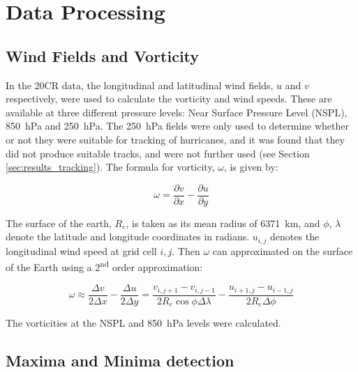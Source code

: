 \documentclass[pdftex,12pt,a4paper]{report}
\newcommand{\ts}{\textsuperscript}
\begin{document}
\section{Data Processing}

\subsection{Wind Fields and Vorticity}
\label{sec:vort}

In the 20CR data, the longitudinal and latitudinal wind fields, $u$ and $v$ respectively, were used
to calculate the vorticity and wind speeds. These are available at three different pressure levels:
Near Surface Pressure Level (NSPL), \SI{850}{hPa} and \SI{250}{hPa}. The \SI{250}{hPa} fields were
only used to determine whether or not they were suitable for tracking of hurricanes, and it was
found that they did not produce suitable tracks, and were not further used (see Section
\ref{sec:results_tracking}). The formula for vorticity, $\omega$, is given by:

\begin{equation}
    \omega = \frac{\partial v}{\partial x} - \frac{\partial u}{\partial y}
    \label{eqn:vorticity}
\end{equation}

The surface of the earth, $R_e$, is taken as its mean radius of \SI{6371}{km}, and $\phi$, $\lambda$
denote the latitude and longitude coordinates in radians. $u_{i, j}$ denotes the longitudinal wind
speed at grid cell $i, j$. Then $\omega$ can approximated on the surface of the Earth using a
2\ts{nd} order approximation: %


\begin{equation}
    \omega \approx \frac{\Delta v}{2 \Delta x} - \frac{\Delta u}{2 \Delta y} = \frac{v_{i,j+1} - v_{i,j-1}}{2 R_e \cos{\phi} \Delta \lambda} - \frac{u_{i+1,j} - u_{i-1,j}}{2 R_e \Delta \phi }
    \label{eqn:vorticity_2nd_order}
\end{equation}

The vorticities at the NSPL and \SI{850}{hPa} levels were calculated.

\subsection{Maxima and Minima detection}
\label{sec:methods_maxima_minima}
\end{document}
